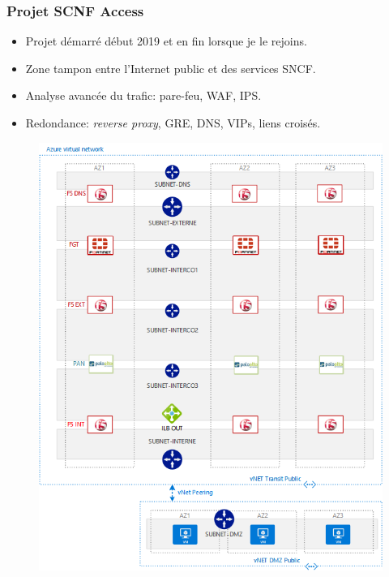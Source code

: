 \documentclass[french, a4paper]{beamer}
\begin{document}
\begin{frame}
    \frametitle{Projet SCNF Access}
    \begin{itemize}
        \item Projet démarré début 2019 et en fin lorsque je le rejoins.
        \item Zone tampon entre l'Internet public et des services SNCF\@.
        \item Analyse avancée du trafic: pare-feu, WAF, IPS\@.
        \item Redondance: \textit{reverse proxy}, GRE, DNS, VIPs, liens croisés.
    \end{itemize}
\end{frame}

\begin{frame}
    \begin{figure}[h!]
        \centering
        \includegraphics[height = \textheight]{img/sncf-access/arch.png}%
        \label{fig:sncf-access/arch}
    \end{figure}
\end{frame}
\end{document}
